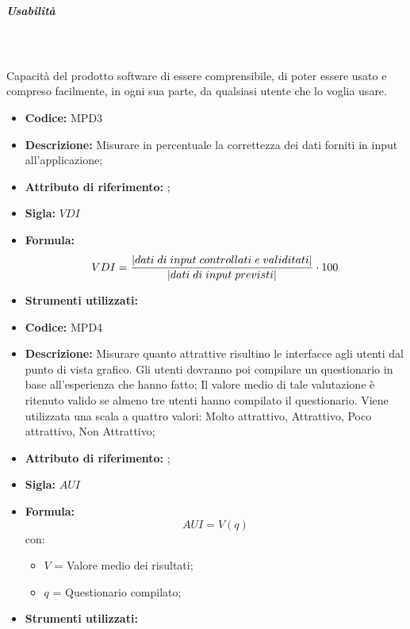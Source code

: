 \subparagraph{Usabilità} \mbox{}\\ \\
Capacità del prodotto software di essere comprensibile, di poter essere usato e compreso facilmente, in ogni sua parte, da qualsiasi utente che lo voglia usare.\\
\begin{itemize}
    \item \textbf{Codice:} MPD3
    \item \textbf{Descrizione:} Misurare in percentuale la correttezza dei dati forniti in input all'applicazione;
    \item \textbf{Attributo di riferimento:} ;
    \item \textbf{Sigla:} $VDI$
    \item \textbf{Formula:} $$VDI = {|dati \; di \; input \; controllati \; e \; validitati| \over |dati \; di \; input \; previsti|} \cdot 100$$  
    \item \textbf{Strumenti utilizzati:}
\end{itemize}

\begin{itemize}
    \item \textbf{Codice: } MPD4
    \item \textbf{Descrizione:} Misurare quanto attrattive risultino le interfacce agli utenti dal punto di vista grafico.
    Gli utenti dovranno poi compilare un questionario in base all'esperienza che hanno fatto;
    Il valore medio di tale valutazione è ritenuto valido se almeno tre utenti hanno compilato il questionario. 
    Viene utilizzata una scala a quattro valori: Molto attrattivo, Attrattivo, Poco attrattivo, Non Attrattivo;
    \item \textbf{Attributo di riferimento:} ;
    \item \textbf{Sigla:} $AUI$
    \item \textbf{Formula:}$$AUI = V(q) $$
    con:
        \begin{itemize}
        \item $V$ = Valore medio dei risultati;
        \item $q$ = Questionario compilato;
        \end{itemize}
    \item \textbf{Strumenti utilizzati:}
\end{itemize}

